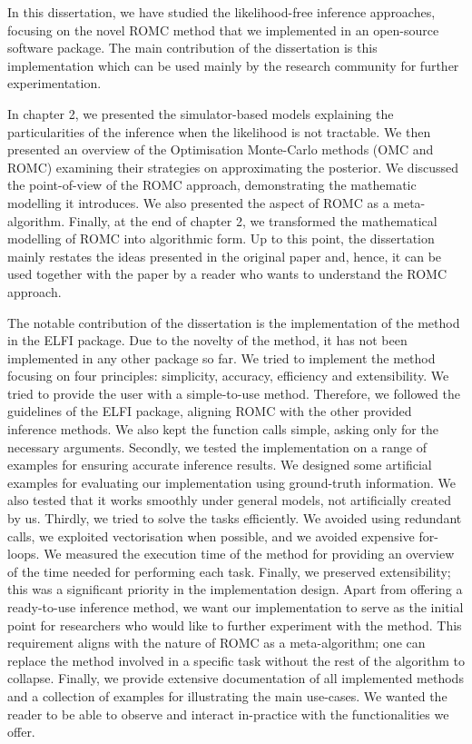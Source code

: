 In this dissertation, we have studied the likelihood-free inference
approaches, focusing on the novel ROMC method that we implemented in
an open-source software package. The main contribution of the
dissertation is this implementation which can be used mainly by the
research community for further experimentation.

In chapter 2, we presented the simulator-based models explaining the
particularities of the inference when the likelihood is not
tractable. We then presented an overview of the Optimisation
Monte-Carlo methods (OMC and ROMC) examining their strategies on
approximating the posterior. We discussed the point-of-view of the
ROMC approach, demonstrating the mathematic modelling it
introduces. We also presented the aspect of ROMC as a
meta-algorithm. Finally, at the end of chapter 2, we transformed the
mathematical modelling of ROMC into algorithmic form. Up to this
point, the dissertation mainly restates the ideas presented in the
original paper \autocite{Ikonomov2019} and, hence, it can be used
together with the paper by a reader who wants to understand the ROMC
approach.

The notable contribution of the dissertation is the implementation of
the method in the ELFI package. Due to the novelty of the method, it
has not been implemented in any other package so far. We tried to
implement the method focusing on four principles: simplicity,
accuracy, efficiency and extensibility. We tried to provide the user
with a simple-to-use method. Therefore, we followed the guidelines of
the ELFI package, aligning ROMC with the other provided inference methods. We
also kept the function calls simple, asking only for the necessary
arguments. Secondly, we tested the implementation on a range of
examples for ensuring accurate inference results. We designed some
artificial examples for evaluating our implementation using
ground-truth information. We also tested that it works smoothly under
general models, not artificially created by us. Thirdly, we tried to
solve the tasks efficiently. We avoided using redundant calls, we
exploited vectorisation when possible, and we avoided expensive
for-loops.  We measured the execution time of the method for providing
an overview of the time needed for performing each task. Finally, we
preserved extensibility; this was a significant priority in the
implementation design. Apart from offering a ready-to-use inference
method, we want our implementation to serve as the initial point for
researchers who would like to further experiment with the method. This
requirement aligns with the nature of ROMC as a meta-algorithm; one
can replace the method involved in a specific task without the rest of
the algorithm to collapse. Finally, we provide extensive documentation
of all implemented methods and a collection of examples for
illustrating the main use-cases. We wanted the reader to be able to
observe and interact in-practice with the functionalities we offer.